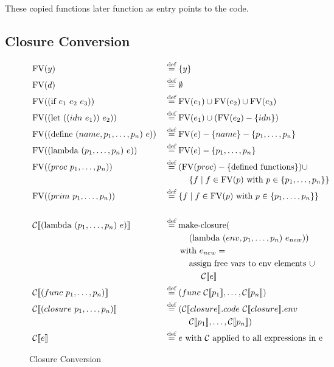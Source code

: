 \documentclass[11pt]{report}
\newcommand{\eqdef}{\stackrel{\text{def}}{=}}%
\begin{document}
These copied functions later function as entry points to the code.

\subsection{Closure Conversion}
\begin{figure}%
\begin{alignat*}{2}
&\text{FV}(y) &&\eqdef \{y\}\\
&\text{FV}(d) &&\eqdef \emptyset\\
&\text{FV}((\text{if}\ e_1\ e_2\ e_3)) &&\eqdef \text{FV}(e_1) \cup \text{FV}(e_2) \cup \text{FV}(e_3)\\
&\text{FV}((\text{let}\ ((idn\ e_1))\ e_2)) &&\eqdef \text{FV}(e_1) \cup (\text{FV}(e_2) - \{idn\})\\
&\text{FV}((\text{define}\ (name, p_1, \dots, p_n)\ e)) &&\eqdef \text{FV}(e) - \{name\} - \{p_1, \dots, p_n\}\\
&\text{FV}((\text{lambda}\ (p_1, \dots, p_n)\ e)) &&\eqdef \text{FV}(e) - \{p_1, \dots, p_n\}\\
&\text{FV}((proc\ p_1, \dots, p_n)) &&\eqdef (\text{FV}(proc) - \{\text{defined functions}\}) \cup \\
&&&\hspace{1cm}\{f \mid f \in \text{FV}(p)\ \text{with}\ p \in \{p_1, \dots, p_n\}\}\\
&\text{FV}((prim\ p_1, \dots, p_n)) &&\eqdef \{f \mid f \in \text{FV}(p)\ \text{with}\ p \in \{p_1, \dots, p_n\}\}\\
%
&&&\\
%
&\mathcal{C}\llbracket (\text{lambda}\ (p_1, \dots, p_n)\ e) \rrbracket &&\eqdef \text{make-closure}(\\
&&&\hspace{1cm}(\text{lambda}\ (env, p_1, \dots, p_n)\ e_{new}))\\
&&&\hspace{0.625cm}\text{with}\ e_{new} = \\
&&&\hspace{1cm}\text{assign free vars to env elements}\ \cup \\
&&&\hspace{1.5cm}\mathcal{C}\llbracket e \rrbracket\\
%
&\mathcal{C}\llbracket (func\ p_1, \dots, p_n) \rrbracket &&\eqdef (func\  \mathcal{C}\llbracket p_1 \rrbracket, \dots, \mathcal{C}\llbracket p_n \rrbracket)\\
&\mathcal{C}\llbracket (closure\ p_1, \dots, p_n) \rrbracket &&\eqdef (\mathcal{C}\llbracket closure\rrbracket.code\ \mathcal{C}\llbracket closure\rrbracket.env\\\
&&&\hspace{1cm}\mathcal{C}\llbracket p_1\rrbracket, \dots, \mathcal{C}\llbracket p_n\rrbracket)\\
&\mathcal{C}\llbracket e \rrbracket && \eqdef e\text{ with $\mathcal{C}$ applied to all expressions in e}\\
\end{alignat*}
\caption{Closure Conversion}
\label{cloconv}
\end{figure}
\end{document}
